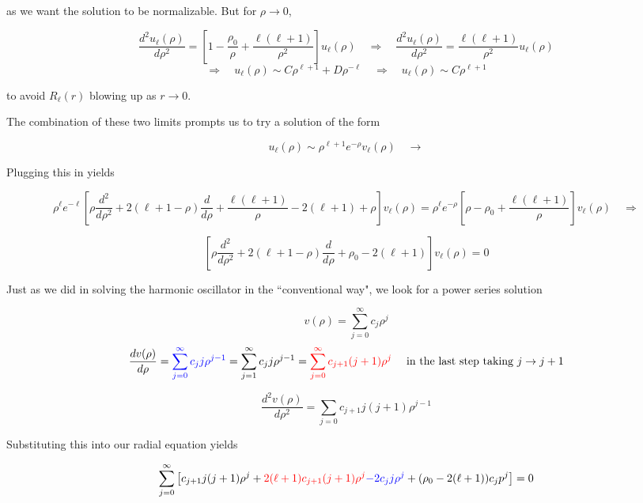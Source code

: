 as we want the solution to be normalizable. But for $\rho \rightarrow 0$, 

\[
\frac{d^2 u_\ell (\rho)}{d \rho^2} = \left[ 1 -\frac{\rho_0}{\rho} + \frac{\ell
(\ell + 1)}{\rho^2} \right] u_\ell (\rho) \quad \Rightarrow \quad \frac{d^2
u_\ell (\rho)}{d \rho^2} = \frac{\ell (\ell +1)}{\rho^2} u_\ell (\rho) \] 
\[ \Rightarrow \quad u_\ell (\rho) \sim C\rho^{\ell +1} + D\rho^{-\ell } \quad
\Rightarrow \quad u_\ell (\rho) \sim C\rho^{\ell +1}
\] \vspace{3px}

to avoid $R_\ell (r)$ blowing up as $r\rightarrow 0$. 

The combination of these two limits prompts us to try a solution of the form 

\[
  u_\ell (\rho) \sim \rho^{\ell +1} e^{-\rho} v_\ell (\rho) \quad \rightarrow 
\] \vspace{3px}


Plugging this in yields

\[ \rho^\ell e^{-\ell } \left[ \rho \frac{d^2 }{d \rho^2} + 2(\ell  + 1 - \rho)
\frac{d }{d \rho} + \frac{\ell (\ell +1)}{\rho} - 2(\ell +1) + \rho \right]
v_\ell (\rho) = \rho^\ell e^{-\rho} \left[ \rho - \rho_0 + \frac{\ell (\ell
+1)}{\rho} \right] v_\ell (\rho) \quad \Rightarrow \]

\[ \left[ \rho \frac{d^2 }{d \rho^2} + 2(\ell +1 - \rho) \frac{d }{d \rho} + \rho_0
- 2(\ell +1) \right] v_\ell (\rho) = 0 \] \vspace{3px}


Just as we did in solving the harmonic oscillator in the ``conventional way",
we look for a power series solution 

\[
v(\rho) = \sum_{j=0}^{\infty} c_j \rho^j
\] 
\[ \frac{d v(\rho)}{d \rho} = \textcolor{blue}{ \sum_{j=0}^{\infty} c_j
  j \rho^{j-1} } = \sum_{j=1}^{\infty} c_j j \rho^{j -1}
= \textcolor{red}{\sum_{j=0}^{\infty}c_{j+1} (j+1) \rho^j} \quad \text{ in the last
step taking }  j \rightarrow j+1 \]

\[ \frac{d^2 v(\rho)}{d \rho^2} = \sum_{j=0}^{} c_{j+1} j (j+1) \rho^{j-1}
    \] \vspace{3px}

Substituting this into our radial equation yields 

\[
  \sum_{j=0}^{\infty} \left[ c_{j+1} j(j+1) \rho^j + \textcolor{red}{ 2(\ell +1)
    c_{j+1} (j+1) \rho^j} \textcolor{blue}{- 2c_j j \rho^j } + (\rho_0 - 2(\ell
  +1))c_j p^j \right] = 0
\] \vspace{3px}

